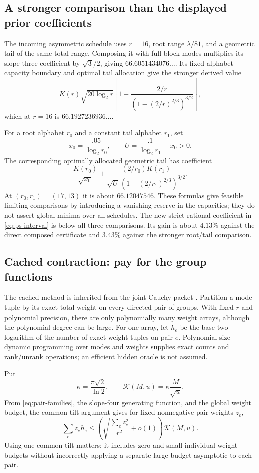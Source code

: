 \subsection{A stronger comparison than the displayed prior coefficients}

The incoming asymmetric schedule uses $r=16$, root range $\lambda/81$,
and a geometric tail of the same total range. Composing it with full-block
modes multiplies its slope-three coefficient by $\sqrt3/2$, giving
$66.6051434076\ldots$. Its fixed-alphabet capacity boundary and optimal
tail allocation give the stronger derived value
\begin{equation}\label{eq:prior-fixed}
 K(r)\sqrt{20\log_2r}
 \left[1+\frac{2/r}{(1-(2/r)^{2/3})^{3/2}}\right],
\end{equation}
which at $r=16$ is $66.1927236936\ldots$.

For a root alphabet $r_0$ and a constant tail alphabet $r_1$, set
\[
 x_0=\frac{.05}{\log_2r_0},\qquad
 U=\frac{.1}{\log_2r_1}-x_0>0.
\]
The corresponding optimally allocated geometric tail has coefficient
\[
 \frac{K(r_0)}{\sqrt{x_0}}+
 \frac{(2/r_0)K(r_1)}{\sqrt U\,(1-(2/r_1)^{2/3})^{3/2}}.
\]
At $(r_0,r_1)=(17,13)$ it is about $66.12047546$. These formulas give
feasible limiting comparisons by introducing a vanishing reserve in the
capacities; they do not assert global minima over all schedules. The new
strict rational coefficient in \eqref{eq:ps-interval} is below all three
comparisons. Its gain is about $4.13\%$ against the direct composed
certificate and $3.43\%$ against the stronger root/tail comparison.

\subsection{Cached contraction: pay for the group functions}
\label{sec:cache-theory}

The cached method is inherited from the joint-Cauchy packet \cite{joint}.
Partition a mode tuple by its exact total weight on every directed pair
of groups. With fixed $r$ and polynomial precision, there are only
polynomially many weight arrays, although the polynomial degree can be
large. For one array, let $h_e$ be the base-two logarithm of the number
of exact-weight tuples on pair $e$. Polynomial-size dynamic programming
over modes and weights supplies exact counts and rank/unrank operations;
an efficient hidden oracle is not assumed.

Put
\begin{equation}\label{eq:cache-K}
 \kappa=\frac{\pi\sqrt2}{\ln2},\qquad
 \mathcal K(M,u)=\kappa\frac{M}{\sqrt u}.
\end{equation}
From \eqref{eq:pair-families}, the slope-four generating function, and
the global weight budget, the common-tilt argument gives for fixed
nonnegative pair weights $z_e$,
\begin{equation}\label{eq:weighted-entropy}
 \sum_ez_e h_e\le
 \left(\sqrt{\frac{\sum_ez_e^2}{r^2}}+o(1)\right)\mathcal K(M,u).
\end{equation}
Using one common tilt matters: it includes zero and small individual
weight budgets without incorrectly applying a separate large-budget
asymptotic to each pair.

